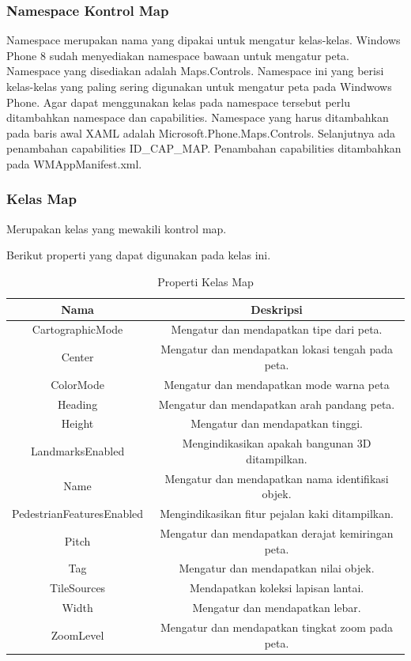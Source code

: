 \subsubsection{Namespace Kontrol Map}
\label{subsubsec:Namespace Kontrol Map}
\hspace{0.5cm} Namespace merupakan nama yang dipakai untuk mengatur kelas-kelas. Windows Phone 8 sudah menyediakan namespace bawaan untuk mengatur peta. Namespace yang disediakan adalah Maps.Controls. Namespace ini yang berisi kelas-kelas yang paling sering digunakan untuk mengatur peta pada Windwows Phone.  Agar dapat menggunakan kelas pada namespace tersebut perlu ditambahkan namespace dan capabilities. Namespace yang harus ditambahkan pada baris awal XAML adalah Microsoft.Phone.Maps.Controls. Selanjutnya ada penambahan capabilities ID\_CAP\_MAP. Penambahan capabilities ditambahkan pada WMAppManifest.xml.

\subsubsection{Kelas Map}
\label{subsubsec:Kelas Map}
\hspace{0.5cm} Merupakan kelas yang mewakili kontrol map.

Berikut properti yang dapat digunakan pada kelas ini.
\begin{table}[h]
	\centering
		\begin{tabular}{ |c||c|}
				\hline
					Nama & Deskripsi \\ \hline
					CartographicMode & Mengatur dan mendapatkan tipe dari peta. \\ \hline
					Center & Mengatur dan mendapatkan lokasi tengah pada peta. \\ \hline
					ColorMode & Mengatur dan mendapatkan mode warna peta \\ \hline
					Heading & Mengatur dan mendapatkan arah pandang peta. \\ \hline
					Height & Mengatur dan mendapatkan tinggi. \\ \hline
					LandmarksEnabled & Mengindikasikan apakah bangunan 3D ditampilkan. \\ \hline
					Name & Mengatur dan mendapatkan nama identifikasi objek. \\ \hline
					PedestrianFeaturesEnabled & Mengindikasikan fitur pejalan kaki ditampilkan. \\ \hline
					Pitch & Mengatur dan mendapatkan derajat kemiringan peta. \\ \hline
					Tag & Mengatur dan mendapatkan nilai objek. \\ \hline
					TileSources & Mendapatkan koleksi lapisan lantai. \\ \hline
					Width & Mengatur dan mendapatkan lebar. \\ \hline
					ZoomLevel & Mengatur dan mendapatkan tingkat zoom pada peta. \\ \hline
				\hline
		\end{tabular}
	\caption{Properti Kelas Map}
	\label{tab:PropertiKelasMap}
\end{table}

